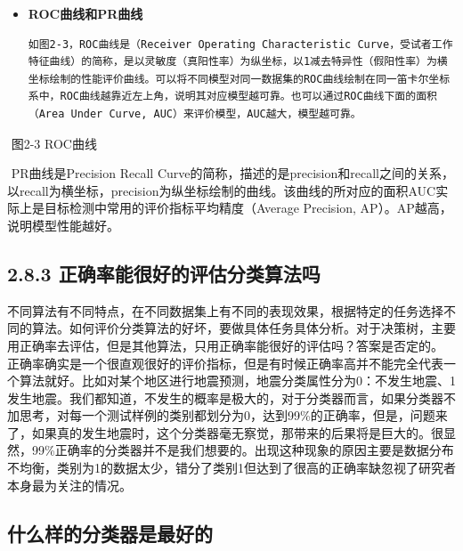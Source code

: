 \begin{itemize}
\item
  \textbf{ROC曲线和PR曲线}

\begin{verbatim}
如图2-3，ROC曲线是（Receiver Operating Characteristic Curve，受试者工作特征曲线）的简称，是以灵敏度（真阳性率）为纵坐标，以1减去特异性（假阳性率）为横坐标绘制的性能评价曲线。可以将不同模型对同一数据集的ROC曲线绘制在同一笛卡尔坐标系中，ROC曲线越靠近左上角，说明其对应模型越可靠。也可以通过ROC曲线下面的面积（Area Under Curve, AUC）来评价模型，AUC越大，模型越可靠。
\end{verbatim}
\end{itemize}

\begin{figure}
\centering
\caption{}
\end{figure}

​ 图2-3 ROC曲线

​ PR曲线是Precision Recall
Curve的简称，描述的是precision和recall之间的关系，以recall为横坐标，precision为纵坐标绘制的曲线。该曲线的所对应的面积AUC实际上是目标检测中常用的评价指标平均精度（Average
Precision, AP）。AP越高，说明模型性能越好。

\subsection{2.8.3
正确率能很好的评估分类算法吗}\label{ux6b63ux786eux7387ux80fdux5f88ux597dux7684ux8bc4ux4f30ux5206ux7c7bux7b97ux6cd5ux5417}

​
不同算法有不同特点，在不同数据集上有不同的表现效果，根据特定的任务选择不同的算法。如何评价分类算法的好坏，要做具体任务具体分析。对于决策树，主要用正确率去评估，但是其他算法，只用正确率能很好的评估吗？
​ 答案是否定的。 ​
正确率确实是一个很直观很好的评价指标，但是有时候正确率高并不能完全代表一个算法就好。比如对某个地区进行地震预测，地震分类属性分为0：不发生地震、1发生地震。我们都知道，不发生的概率是极大的，对于分类器而言，如果分类器不加思考，对每一个测试样例的类别都划分为0，达到99\%的正确率，但是，问题来了，如果真的发生地震时，这个分类器毫无察觉，那带来的后果将是巨大的。很显然，99\%正确率的分类器并不是我们想要的。出现这种现象的原因主要是数据分布不均衡，类别为1的数据太少，错分了类别1但达到了很高的正确率缺忽视了研究者本身最为关注的情况。

\subsection{什么样的分类器是最好的}\label{ux4ec0ux4e48ux6837ux7684ux5206ux7c7bux5668ux662fux6700ux597dux7684}

